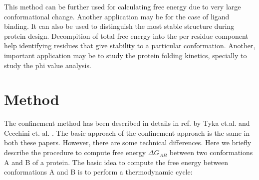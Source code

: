 \documentclass[12pt]{article}
\begin{document}
This method can be further used for calculating free energy due to very large conformational change. Another application may be
for the case of ligand binding. It can also be used to distinguish the most stable structure during protein design. Decompition of 
total free energy into the per residue component help identifying residues that give stability to a particular conformation. 
Another, important application may be to study the protein folding kinetics, specially to study the phi value analysis.            


\section{Method}

The confinement method has been described in details in ref. by Tyka et.al. \cite{Tyka2006} and 
Cecchini et. al. \cite{Cecchini2009}. The basic approach of the confinement approach is the same in both
these papers. However, there are some technical differences. Here we briefly describe the procedure
to compute free energy $\Delta G_{AB}$ between two conformations A and B of a protein. The basic
idea to compute the free energy between conformations A and B is to perform a thermodynamic cycle: 
\end{document}

